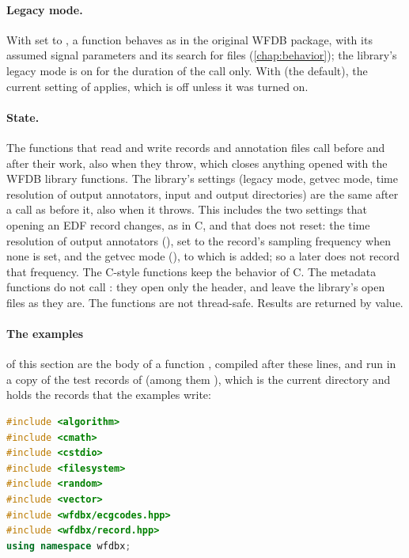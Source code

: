 \paragraph{Legacy mode.} With  set to , a function behaves as in
the original WFDB package, with its assumed signal parameters and its search for files
(\cref{chap:behavior}); the library's legacy mode is on for the duration of the call
only. With  (the default), the current setting of 
applies, which is off unless it was turned on.

\paragraph{State.} The functions that read and write records and annotation files call
 before and after their work, also when they throw, which closes
anything opened with the WFDB library functions. The library's settings (legacy mode,
getvec mode, time resolution of output annotators, input and output directories) are the
same after a call as before it, also when it throws. This includes the two settings that
opening an EDF record changes, as in C, and that  does not reset: the
time resolution of output annotators (), set to the record's sampling
frequency when none is set, and the getvec mode (), to which
 is added; so a later  does not record
that frequency. The C-style functions keep the behavior of C. The metadata functions do
not call : they open only the header, and leave the library's open files
as they are. The functions are not thread-safe. Results are returned by value.

\paragraph{The examples} of this section are the body of a function , compiled
after these lines, and run in a copy of the test records of  (among them
), which is the current directory and holds the records that the examples
write:
\begin{lstlisting}[language=C++]
#include <algorithm>
#include <cmath>
#include <cstdio>
#include <filesystem>
#include <random>
#include <vector>
#include <wfdbx/ecgcodes.hpp>
#include <wfdbx/record.hpp>
using namespace wfdbx;
\end{lstlisting}

